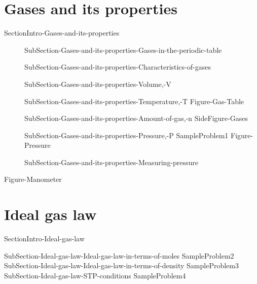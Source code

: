 \documentclass[main.tex]{subfiles}
\newcommand\chapterlabel{Ch-Gas}\setcounter{figurenewcounter}{0}\setcounter{tablenewcounter}{0}\setcounter{formulanewcounter}{0}
\begin{document}
\section{Gases and its properties} {SectionIntro-Gases-and-its-properties}
\sloppy \begin{description}
\item[]  {SubSection-Gases-and-its-properties-Gases-in-the-periodic-table}
\item[]  {SubSection-Gases-and-its-properties-Characteristics-of-gases}
 \item[] {SubSection-Gases-and-its-properties-Volume,-V}
 \item[]{SubSection-Gases-and-its-properties-Temperature,-T}
 {Figure-Gas-Table}
 \item[] {SubSection-Gases-and-its-properties-Amount-of-gas,-n}
 {SideFigure-Gases}
\item[] {SubSection-Gases-and-its-properties-Pressure,-P}
{SampleProblem1}
 {Figure-Pressure}
\item[]  {SubSection-Gases-and-its-properties-Measuring-pressure}
\end{description}



 {Figure-Manometer}
 \section{Ideal gas law}{SectionIntro-Ideal-gas-law}
\sloppy \begin{description}
 {SubSection-Ideal-gas-law-Ideal-gas-law-in-terms-of-moles}
{SampleProblem2}
 {SubSection-Ideal-gas-law-Ideal-gas-law-in-terms-of-density}
{SampleProblem3}
 {SubSection-Ideal-gas-law-STP-conditions}
{SampleProblem4}
\end{description}
\end{document}
